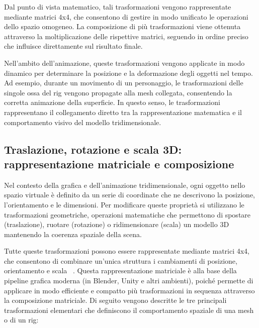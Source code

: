 Dal punto di vista matematico, tali trasformazioni vengono rappresentate mediante matrici 4x4, che consentono di gestire in modo unificato le operazioni dello spazio omogeneo. La composizione di più trasformazioni viene ottenuta attraverso la moltiplicazione delle rispettive matrici, seguendo in ordine preciso che influisce direttamente sul risultato finale.

Nell'ambito dell'animazione, queste trasformazioni vengono applicate in modo dinamico per determinare la posizione e la deformazione degli oggetti nel tempo. Ad esempio, durante un movimento di un personaggio, le trasformazioni delle singole ossa del rig vengono propagate alla mesh collegata, consentendo la corretta animazione della superficie. In questo senso, le trasformazioni rappresentano il collegamento diretto tra la rappresentazione matematica e il comportamento visivo del modello tridimensionale.

\subsection{Traslazione, rotazione e scala 3D: rappresentazione matriciale e composizione}
Nel contesto della grafica e dell'animazione tridimensionale, ogni oggetto nello spazio virtuale è definito da un serie di coordinate che ne descrivono la posizione, l'orientamento e le dimensioni. 
Per modificare queste proprietà si utilizzano le trasformazioni geometriche, operazioni matematiche che permettono di spostare (traslazione), ruotare (rotazione) o ridimensionare (scala) un modello 3D mantenendo la coerenza spaziale della scena.

Tutte queste trasformazioni possono essere rappresentate mediante matrici 4x4, che consentono di combinare un'unica struttura i cambiamenti di posizione, orientamento e scala ~\cite{tras}. Questa rappresentazione matriciale è alla base della pipeline grafica moderna (in Blender, Unity e altri ambienti), poiché permette di applicare in modo efficiente e compatto più trasformazioni in sequenza attraverso la composizione matriciale.
Di seguito vengono descritte le tre principali trasformazioni elementari che definiscono il comportamento spaziale di una mesh o di un rig:

